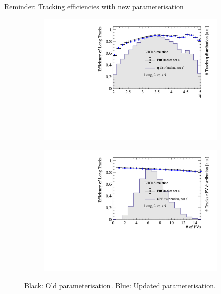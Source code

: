 \documentclass[xcolor={dvipsnames}]{beamer}
\begin{document}
\begin{frame}{Reminder: Tracking efficiencies with new parameterisation}
\begin{figure}[htb]
\begin{subfigure}{0.45\textwidth}
      \includegraphics[width=1\textwidth]{Plots/TrackEfficiency_eta_bad_MC_parameterisation.pdf}
    \end{subfigure}%
    \begin{subfigure}{0.45\textwidth}
      \includegraphics[width=1\textwidth]{Plots/TrackEfficiency_nPV_bad_MC_parameterisation.pdf}
    \end{subfigure}
    \vspace{-0.2cm}
    \caption*{Black: Old parameterisation. {\color{blue}Blue: Updated parameterisation}.}
  \end{figure}
\end{frame}
\end{document}
